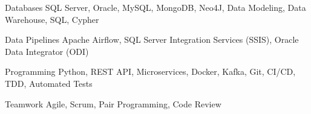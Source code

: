 


\begin{cvskills}


\cvskill
{Databases} %
{SQL Server, Oracle, MySQL, MongoDB, Neo4J, Data Modeling, Data Warehouse, SQL, Cypher} %

\cvskill
{Data Pipelines} %
{Apache Airflow, SQL Server Integration Services (SSIS), Oracle Data Integrator (ODI)} %

\cvskill
{Programming} %
{Python, REST API, Microservices, Docker, Kafka, Git, CI/CD, TDD, Automated Tests} %


\cvskill
{Teamwork} %
{Agile, Scrum, Pair Programming, Code Review} %


\end{cvskills}